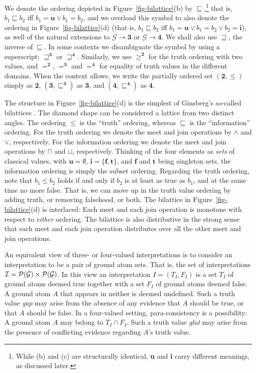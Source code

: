 \documentclass{tlp}
\newcommand{\Bi}{\ensuremath{\mathbf{2}}}
\newcommand{\Tri}{\ensuremath{\mathbf{3}}}
\newcommand{\Quad}{\ensuremath{\mathbf{4}}}
\newcommand{\pset}[1]{{\cal P}(#1)}
\newcommand{\fun}{\rightarrow}
\newcommand{\Her}{\mathcal{G}}
\newcommand{\Interp}{\mathcal{I}}
\begin{document}
We denote the ordering depicted in Figure~\ref{fig-bilattice}(b) by
$\sqsubseteq$,\footnote{While (b) and (c) are structurally identical, 
\textbf{u} and \textbf{i} carry different meanings, as discussed later.} 
that is, $b_1 \sqsubseteq b_2$ iff
$b_1 = \mathbf{u} \lor b_1 = b_2$, and we overload this symbol
to also denote the ordering in Figure~\ref{fig-bilattice}(d)
(that is, $b_1 \sqsubseteq b_2$ iff
$b_1 = \mathbf{u} \lor b_1 = b_2 \lor b_2 = \mathbf{i}$), as well
of the natural extensions to $\Her \fun \Tri$ or
$\Her \fun \Quad$.
We shall also use $\sqsupseteq$, the inverse of $\sqsubseteq$.
In some contexts we disambiguate the symbol by using a superscript:
$\sqsupseteq^\Tri$ or $\sqsupseteq^\Quad$.  Similarly, we use
$\ge^\Bi$ for the truth ordering with two values, and $=^\Bi$, $=^\Tri$ and $=^\Quad$
for equality of truth values in the different domains.
When the context allows, we write the partially ordered set 
$(\Bi,\leq)$ simply as $\Bi$, $(\Tri,\sqsubseteq^{\Tri})$ as $\Tri$,
and $(\Quad,\sqsubseteq^{\Quad})$ as $\Quad$.

The structure in Figure~\ref{fig-bilattice}(d) is the simplest of
Ginsberg's so-called bilattices \cite{ginsberg:1988}.
The diamond shape can be considered a lattice from two distinct angles.
The ordering $\leq$ is the ``truth'' ordering, whereas $\sqsubseteq$
is the ``information'' ordering.
For the truth ordering we denote the meet and join operations by
$\land$ and $\lor$, respectively.
For the information ordering we denote the meet and join operations by
$\sqcap$ and $\sqcup$, respectively.
Thinking of the four elements as \emph{sets} of classical values,
with $\mathbf{u} = \emptyset$, $\mathbf{i} = \{\mathbf{f},\mathbf{t}\}$,
and $\mathbf{f}$ and $\mathbf{t}$ being singleton sets,
the information ordering is simply the subset ordering.
Regarding the truth ordering, note that
$b_1 \leq b_2$ holds if and only if $b_2$ is at least as true
as $b_1$, and at the same time no more false.
That is, we can move up in the truth value ordering by adding
truth, or removing falsehood, or both.
The bilattice in Figure~\ref{fig-bilattice}(d) is interlaced: 
Each meet and each join operation is monotone with respect to 
\emph{either} ordering.
The bilattice is also distributive in the strong sense that each meet and
each join operation distributes over all the other meet and join 
operations.

An equivalent view of three- or four-valued interpretations is to
consider an interpretation to be a pair of ground atom sets.
That is, the set of interpretations
$\Interp = \pset{\Her} \times \pset{\Her}$.
In this view an interpretation $I = (T_I,F_I)$ is a set $T_I$ of
ground atoms deemed true together with a set $F_I$ of ground atoms 
deemed false.
A ground atom $A$ that appears in neither is deemed undefined.
Such a truth value \emph{gap} may arise from the absence of any
evidence that $A$ should be true, or that $A$ should be false.
In a four-valued setting, para-consistency is a possibility:
A ground atom $A$ may belong to $T_I \cap F_I$.
Such a truth value \emph{glut} may arise from the presence of
conflicting evidence regarding $A$'s truth value.
\end{document}
